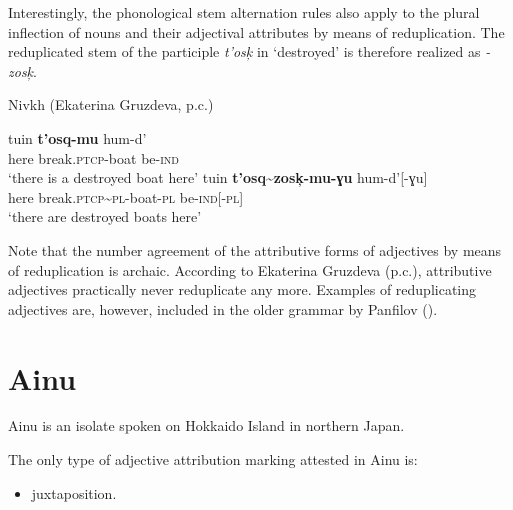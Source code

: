Interestingly, the phonological stem alternation rules also apply to the plural inflection of nouns and their adjectival attributes by means of reduplication. The reduplicated stem of the participle \textit{t'osk̦} in  ‘destroyed’ is therefore realized as \textit{-zosk̦}.
\begin{exe}
\ex
\label{nivkh redup}
\rm{Nivkh (Ekaterina Gruzdeva, p.c.)}
\begin{xlist}
\ex 
\gll	tuin \textbf{t'osq-mu} hum-d'\\
	here break.\textsc{ptcp}-boat be-\textsc{ind}\\
\glt	‘there is a destroyed boat here’ 
\ex
\label{nivkh unaltered}
\gll	tuin \textbf{t'osq\textasciitilde zosk̦-mu-ɣu} hum-d'[-ɣu]\\
	here break.\textsc{ptcp}\textasciitilde \textsc{pl}-boat-\textsc{pl} be-\textsc{ind}[-\textsc{pl}]\\
\glt	‘there are destroyed boats here’
\end{xlist}
\end{exe}
Note that the number agreement of the attributive forms of adjectives by means of reduplication is archaic. According to Ekaterina Gruzdeva (p.c.), attributive adjectives practically never reduplicate any more. Examples of reduplicating adjectives are, however, included in the older grammar by Panfilov (\citeyear{panfilov1965}).

\section{Ainu}
Ainu is an isolate spoken on Hokkaido Island in northern Japan.

The only type of adjective attribution marking attested in Ainu is:
\begin{itemize}
\item juxtaposition.
\end{itemize}

